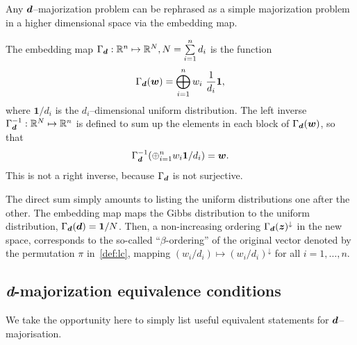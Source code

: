 Any $\bm{d}$--majorization problem can be rephrased as a simple majorization problem in a higher dimensional space via the embedding map.
\begin{definition}
  The embedding map $\Gamma_{\bm{d}}:\mathbb{R}^n \mapsto \mathbb{R}^N, N = \sum\limits_{i=1}^n d_i$ is the function
  \begin{equation}
    \Gamma_{\bm{d}}(\bm{w}) = \bigoplus_{i=1}^n w_i\  \frac{1}{d_i}\bm{1},
  \end{equation}
where $\bm{1}/d_i$ is the $d_i$--dimensional uniform distribution.
The left inverse $\Gamma_{\bm{d}}^{-1}: \mathbb{R}^N \mapsto \mathbb{R}^n$ is defined to sum up the elements in each block of $\Gamma_{\bm{d}}(\bm{w})$, so that
  \begin{equation}
     \Gamma_{\bm{d}}^{-1}(\oplus_{i=1}^n w_i \bm{1}/d_i) = \bm{w}.
  \end{equation}
  This is not a right inverse, because $\Gamma_{\bm{d}}$ is not surjective.
\end{definition}
The direct sum simply amounts to listing the uniform distributions one after the other.
The embedding map maps the Gibbs distribution to the uniform distribution, $\Gamma_{\bm{d}}(\bm{d}) = \bm{1}/N$.
Then, a non-increasing ordering $\Gamma_{\bm{d}}(\bm{z})^\downarrow$ in the new space, corresponds to the so-called ``$\beta$-ordering'' of the original vector denoted by the permutation $\pi$ in~\cref{def:lc}, mapping $(w_i/d_i) \mapsto (w_i/d_i)^\downarrow$ for all $i=1,\dots,n$.

\subsection{\textit{d}-majorization equivalence conditions}

We take the opportunity here	 to simply list useful equivalent statements for $\bm{d}$--majorisation.


